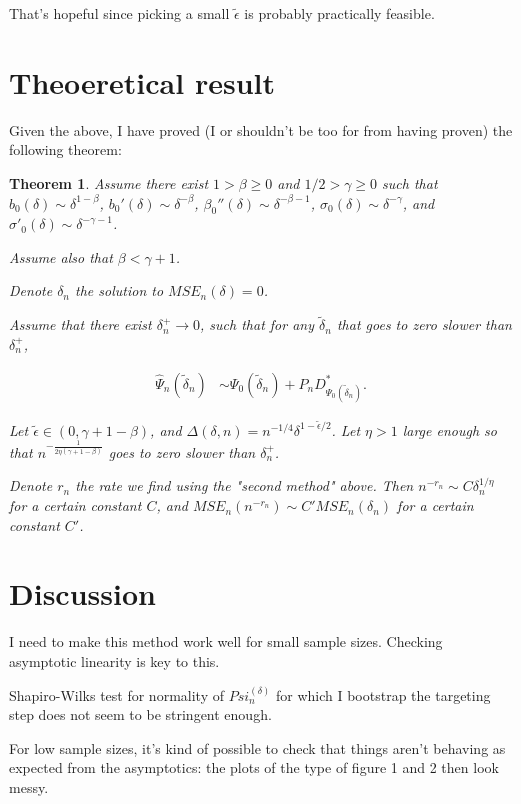 \documentclass[a4paper]{article}
\newtheorem{thm}{Theorem}
\begin{document}
\medskip

That's hopeful since picking a small $\tilde{\epsilon}$ is probably practically feasible.

\medskip

\section{Theoeretical result}

Given the above, I have proved (I or shouldn't be too for from having proven) the following theorem:

\begin{thm}
Assume there exist $1 > \beta \geq 0$ and $1/2 > \gamma \geq 0$ such that $b_0(\delta) \sim \delta^{1 - \beta}$, $b_0'(\delta) \sim \delta^{-\beta}$, $\beta_0''(\delta) \sim \delta^{-\beta - 1}$, $\sigma_0(\delta) \sim \delta^{-\gamma}$, 
and $\sigma'_0(\delta) \sim \delta^{-\gamma - 1}$. 

Assume also that $\beta < \gamma + 1$.


Denote $\delta_n$ the solution to $MSE_n(\delta) = 0$.


Assume that there exist $\delta_n^+ \rightarrow 0$, such that for any $\tilde{\delta}_n$ that goes to zero slower than $\delta_n^+$, 

\begin{align*}
\hat{\Psi}_n(\tilde{\delta}_n) &\sim \Psi_0(\tilde{\delta}_n) + P_n D^*_{\Psi_0(\tilde{\delta}_n)}.
\end{align*}

Let $\tilde{\epsilon} \in (0, \gamma + 1 - \beta)$, and $\Delta(\delta, n) = n^{-1/4} \delta^{1 - \tilde{\epsilon} / 2}$. Let $\eta > 1$ large enough so that $n^{-\frac{1}{2 \eta (\gamma + 1 - \beta)}}$ goes to zero slower than $\delta_n^+$.

Denote $r_n$ the rate we find using the "second method" above. Then $n^{-r_n} \sim C \delta_n^{1 / \eta}$ for a certain constant $C$, and $MSE_n(n^{-r_n}) \sim C' MSE_n(\delta_n)$ for a certain constant $C'$.

\end{thm}

\section{Discussion}

I need to make this method work well for small sample sizes. Checking asymptotic linearity is key to this.

Shapiro-Wilks test for normality of $Psi_n^(\delta)$ for which I bootstrap the targeting step does not seem to be stringent enough.

For low sample sizes, it's kind of possible to check that things aren't behaving as expected from the asymptotics: the plots of the type of figure 1 and 2 then look messy.
\end{document}
